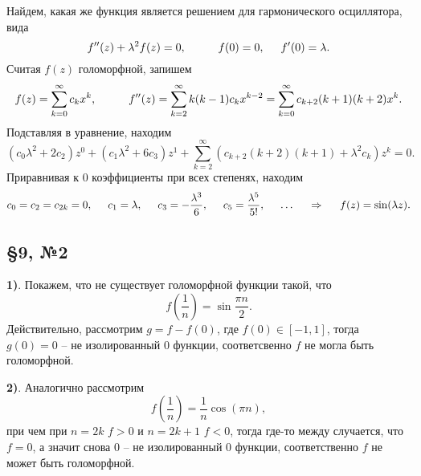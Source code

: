Найдем, какая же функция является решением для гармонического осциллятора, вида
\begin{equation*}
    f''(z) + \lambda^2 f(z) = 0,
    \hspace{10 mm} f(0) = 0, \hspace{5 mm} 
    f'(0) = \lambda.
\end{equation*}
Считая $f(z)$ голоморфной, запишем
\begin{equation*}
    f(z) = \sum_{k=0}^{\infty}  c_k x^k,
    \hspace{10 mm} 
    f''(z) = \sum_{k=2}^{\infty}  
    k (k-1) c_k x^{k-2} = 
    \sum_{k=0}^{\infty} c_{k+2} (k+1) (k+2) x^k.
\end{equation*}
Подставляя в уравнение, находим
\begin{equation*}
    (c_0 \lambda^2 + 2 c_2) z^0 + 
    (c_1 \lambda^2 + 6 c_3) z^1 + 
    \sum_{k=2}^{\infty} \left(
        c_{k+2} (k+2)(k+1) + \lambda^2 c_k
    \right) z^k = 0.
\end{equation*}
Приравнивая к $0$ коэффициенты при всех степенях, находим
\begin{equation*}
    c_0 = c_2 = c_{2k} =  0,
    \hspace{5 mm} 
    c_1 = \lambda,
    \hspace{5 mm} 
    c_3 = - \frac{\lambda^3}{6},
    \hspace{5 mm} 
    c_5 = \frac{\lambda^5}{5!}, \hspace{5 mm} \ldots
    \hspace{0.5cm} \Rightarrow \hspace{0.5cm}
    f(z) = \sin (\lambda z).
\end{equation*}




\subsection*{\S9, №2}


\textbf{1)}. Покажем, что не существует голоморфной функции такой, что
\begin{equation*}
    f\left(\frac{1}{n}\right) = \sin \frac{\pi n}{2}.
\end{equation*}
Действительно, рассмотрим $g = f - f(0)$, где $f(0) \in [-1, 1]$, тогда $g(0) = 0$ -- не изолированный 0 функции, соответсвенно $f$ не могла быть голоморфной. 


\textbf{2)}. Аналогично рассмотрим
\begin{equation*}
    f\left(\frac{1}{n}\right) = \frac{1}{n} \cos(\pi n),
\end{equation*}
при чем при $n = 2 k$ $f > 0$ и $n = 2 k +1$ $f < 0$, тогда где-то между случается, что $f = 0$, а значит снова $0$ -- не изолированный 0 функции, соответственно $f$ не может быть голоморфной. 


